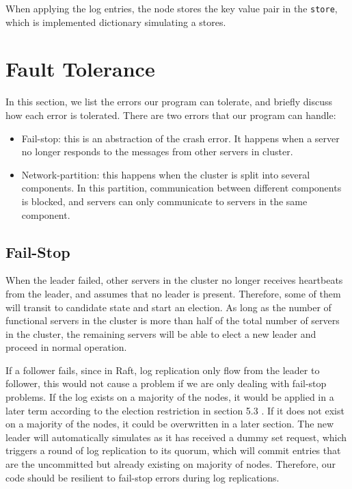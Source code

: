 \documentclass[11pt]{article}
\begin{document}
When applying the log entries, the node stores the key value pair in the \texttt{store}, which is implemented dictionary simulating a stores.

\section{Fault Tolerance}

In this section, we list the errors our program can tolerate, and briefly discuss how each error is tolerated. There are two errors that our program can handle:
\begin{itemize}
    \item Fail-stop: this is an abstraction of the crash error. It happens when a server no longer responds to the messages from other servers in cluster.
    \item Network-partition: this happens when the cluster is split into several components. In this partition, communication between different components is blocked, and servers can only communicate to servers in the same component.
\end{itemize}

\subsection{Fail-Stop}

When the leader failed, other servers in the cluster no longer receives heartbeats from the leader, and assumes that no leader is present. Therefore, some of them will transit to candidate state and start an election. As long as the number of functional servers in the cluster is more than half of the total number of servers in the cluster, the remaining servers will be able to elect a new leader and proceed in normal operation.

If a follower fails, since in Raft, log replication only flow from the leader to follower, this would not cause a problem if we are only dealing with fail-stop problems. If the log exists on a majority of the nodes, it would be applied in a later term according to the election restriction in section 5.3 \cite{Raft}. If it does not exist on a majority of the nodes, it could be overwritten in a later section.  The new leader will automatically simulates as it has received a dummy set request, which triggers a round of log replication to its quorum, which will commit entries that are the uncommitted but already existing on majority of nodes. Therefore, our code should be resilient to fail-stop errors during log replications. 
\end{document}
